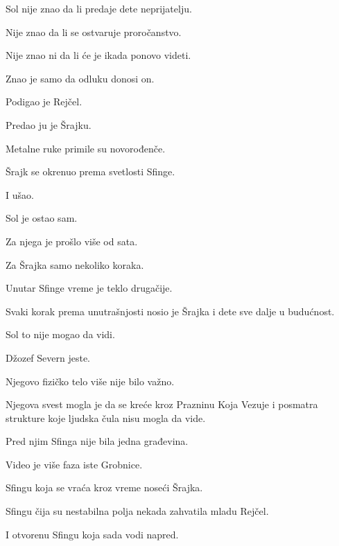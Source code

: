 \bigskip

Sol nije znao da li predaje dete neprijatelju.

Nije znao da li se ostvaruje proročanstvo.

Nije znao ni da li će je ikada ponovo videti.

\bigskip

Znao je samo da odluku donosi on.

\bigskip

Podigao je Rejčel.

\bigskip

Predao ju je Šrajku.

\bigskip

Metalne ruke primile su novorođenče.

\bigskip

Šrajk se okrenuo prema svetlosti Sfinge.

I ušao.

\bigskip

Sol je ostao sam.

\bigskip

Za njega je prošlo više od sata.

\bigskip

Za Šrajka samo nekoliko koraka.

\bigskip

Unutar Sfinge vreme je teklo drugačije.

Svaki korak prema unutrašnjosti nosio je Šrajka i dete sve dalje u budućnost.

\bigskip

Sol to nije mogao da vidi.

\bigskip

Džozef Severn jeste.

\bigskip

Njegovo fizičko telo više nije bilo važno.

Njegova svest mogla je da se kreće kroz Prazninu Koja Vezuje i posmatra strukture koje ljudska čula nisu mogla da vide.

\bigskip

Pred njim Sfinga nije bila jedna građevina.

\bigskip

Video je više faza iste Grobnice.

Sfingu koja se vraća kroz vreme noseći Šrajka.

Sfingu čija su nestabilna polja nekada zahvatila mladu Rejčel.

I otvorenu Sfingu koja sada vodi napred.

